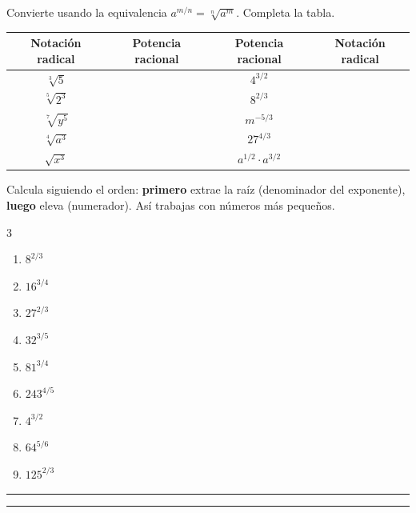 \documentclass[11pt, letterpaper]{article}
\newcommand{\espacio}[1]{%
  \par\vspace{5pt}%
  \noindent\textcolor{zenitnavy!22}{\rule{\linewidth}{1.2pt}}%
  \par\vspace{#1}%
  \noindent\textcolor{zenitnavy!22}{\rule{\linewidth}{1.2pt}}%
  \par\vspace{5pt}%
  \noindent{\small\textbf{Respuesta:}\;\rule{7cm}{0.35pt}}%
  \par\vspace{2mm}}
\begin{document}
\begin{tcolorbox}[ejmedio,
  title={Ejercicio 31 \hfill $\bigstar\bigstar$ \quad Convertir entre notaciones}]

Convierte usando la equivalencia $a^{m/n}=\sqrt[n]{a^m}$. Completa la tabla.

\medskip

\begin{center}
\renewcommand{\arraystretch}{2.0}
\begin{tabular}{|c|c||c|c|}
\hline
\textbf{Notación radical} & \textbf{Potencia racional} &
\textbf{Potencia racional} & \textbf{Notación radical}\\
\hline
$\sqrt[3]{5}$   & & $4^{3/2}$    &\\
\hline
$\sqrt[5]{2^3}$ & & $8^{2/3}$    &\\
\hline
$\sqrt[7]{y^5}$ & & $m^{-5/3}$   &\\
\hline
$\sqrt[4]{a^3}$ & & $27^{4/3}$   &\\
\hline
$\sqrt{x^3}$    & & $a^{1/2}\cdot a^{3/2}$ &\\
\hline
\end{tabular}
\end{center}
\end{tcolorbox}

\vspace{6pt}

\begin{tcolorbox}[ejmedio,
  title={Ejercicio 32 \hfill $\bigstar\bigstar$ \quad Calcular potencias racionales}]

Calcula siguiendo el orden: \textbf{primero} extrae la raíz (denominador del exponente), \textbf{luego} eleva (numerador). Así trabajas con números más pequeños.

\medskip

\begin{multicols}{3}
\begin{enumerate}[label=\alph*), leftmargin=*]
  \item $8^{2/3}$
  \item $16^{3/4}$
  \item $27^{2/3}$
  \item $32^{3/5}$
  \item $81^{3/4}$
  \item $243^{4/5}$
  \item $4^{3/2}$
  \item $64^{5/6}$
  \item $125^{2/3}$
\end{enumerate}
\end{multicols}

\espacio{6.5cm}
\end{tcolorbox}
\end{document}
